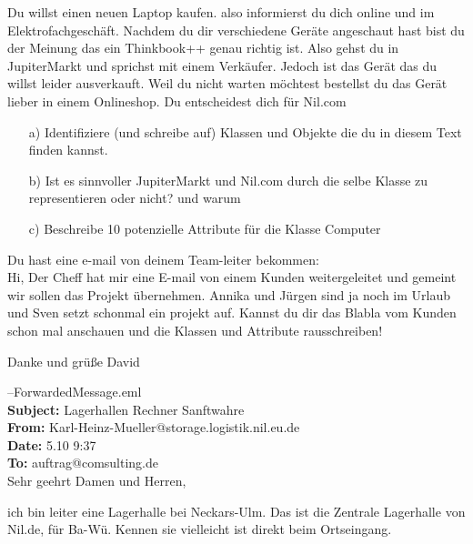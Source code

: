 
    
        \subexcercise Du willst einen neuen Laptop kaufen. also informierst du dich online und im Elektrofachgeschäft. Nachdem du dir verschiedene Geräte angeschaut hast bist du der Meinung das ein Thinkbook++ genau richtig ist. Also gehst du in JupiterMarkt und sprichst mit einem Verkäufer. Jedoch ist das Gerät das du willst leider ausverkauft. Weil du nicht warten möchtest bestellst du das Gerät lieber in einem Onlineshop. Du entscheidest dich für Nil.com
        
        \begin{enumerate}
         \item[a)] Identifiziere (und schreibe auf) Klassen und Objekte die du in diesem Text finden kannst.
         \item[b)] Ist es sinnvoller JupiterMarkt und Nil.com durch die selbe Klasse zu representieren oder nicht? und warum
         \item[c)] Beschreibe 10 potenzielle Attribute für die Klasse Computer
        \end{enumerate}
        \subexcercise Du hast eine e-mail von deinem Team-leiter bekommen:\\
       
        Hi,
        Der Cheff hat mir eine E-mail von einem Kunden weitergeleitet und gemeint wir sollen das Projekt übernehmen. Annika und Jürgen sind ja noch im Urlaub und Sven setzt schonmal ein projekt auf. Kannst du dir das Blabla vom Kunden schon mal anschauen und die Klassen und Attribute rausschreiben!
        
        Danke und grüße
        David
        
        --ForwardedMessage.eml\\
        \textbf{Subject:} Lagerhallen Rechner Sanftwahre\\
        \textbf{From:} Karl-Heinz-Mueller@storage.logistik.nil.eu.de\\
        \textbf{Date:} 5.10 9:37\\
        \textbf{To:} auftrag@comsulting.de\\
        
        Sehr geehrt Damen und Herren,\medskip
        
        ich bin leiter eine Lagerhalle bei Neckars-Ulm. Das ist die Zentrale Lagerhalle von Nil.de, für Ba-Wü. Kennen sie vielleicht ist direkt beim Ortseingang.
        
